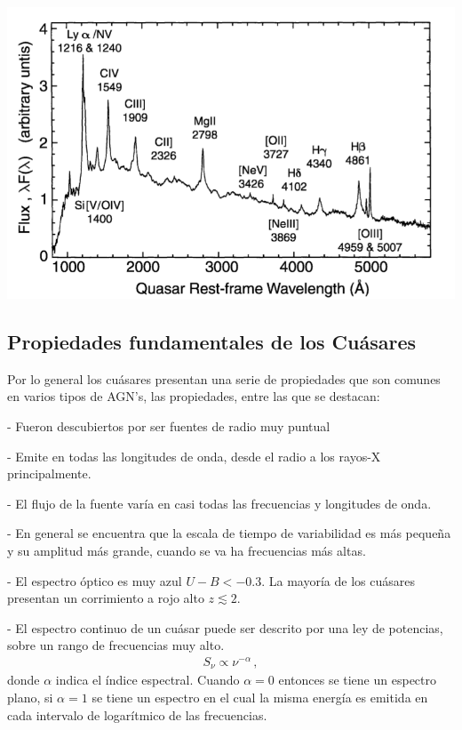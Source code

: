 \includegraphics[scale=.3]{./figures/3_AGNs/Espectro_tipico_AGN.png}
\label{fig:Espectro_QSOs}

	\subsection{Propiedades fundamentales de los Cuásares}
	\label{subsec:Fundamental_properties_quasars}

Por lo general los cuásares presentan una serie de propiedades que son comunes en varios tipos de AGN's, las propiedades, entre las que se destacan:


- Fueron descubiertos por ser fuentes de radio muy puntual 

- Emite en todas las longitudes de onda, desde el radio a los rayos-X principalmente.

- El flujo de la fuente varía en casi todas las frecuencias y longitudes de onda.

- En general se encuentra que la escala de tiempo de variabilidad es más pequeña y su amplitud más grande, cuando se va ha frecuencias más altas.

- El espectro óptico es muy azul $U-B < -0.3$. La mayoría de los cuásares presentan un corrimiento a rojo alto  $z \lesssim 2$.

- El espectro continuo de un cuásar puede ser descrito por una ley de potencias, sobre un rango de frecuencias muy alto.
%
\begin{align}
S_{\nu} \propto \nu^{-\alpha} \,,
\end{align}
%
 donde $\alpha$ indica el índice espectral. Cuando $\alpha=0$ entonces se tiene un espectro plano, si $\alpha=1$ se tiene un espectro en el cual la misma energía es emitida en cada intervalo de logarítmico de las frecuencias. 


